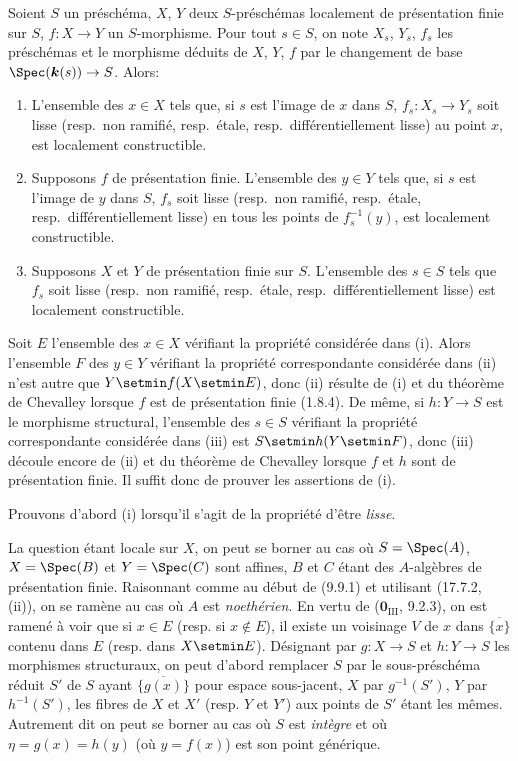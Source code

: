 \begin{proposition}[17.7.11]
\label{IV.17.7.11}
Soient $S$ un préschéma, $X$, $Y$ deux $S$-préschémas localement de présentation finie sur $S$, $f:X\to Y$ un $S$-morphisme. Pour tout $s\in S$, on note $X_s$, $Y_s$, $f_s$ les préschémas et le morphisme déduits de $X$, $Y$, $f$ par le changement de base $\Spec(\boldsymbol{k}(s))\to S$. Alors:
\begin{enumerate}
  \item[\textup{(i)}] L'ensemble des $x\in X$ tels que, si $s$ est l'image de $x$ dans $S$, $f_s:X_s\to Y_s$ soit lisse \textup{(resp.}\ non ramifié, \textup{resp.}\ étale, \textup{resp.}\ différentiellement lisse\textup{)} au point $x$, est localement constructible.
  \item[\textup{(ii)}] Supposons $f$ de présentation finie. L'ensemble des $y\in Y$ tels que, si $s$ est l'image de $y$ dans $S$, $f_s$ soit lisse \textup{(resp.}\ non ramifié, \textup{resp.}\ étale, \textup{resp.}\ différentiellement lisse\textup{)} en tous les points de $f_s^{-1}(y)$, est localement constructible.
  \item[\textup{(iii)}] Supposons $X$ et $Y$ de présentation finie sur $S$. L'ensemble des $s\in S$ tels que $f_s$ soit lisse \textup{(resp.}\ non ramifié, \textup{resp.}\ étale, \textup{resp.}\ différentiellement lisse\textup{)} est localement constructible.
\end{enumerate}
\end{proposition}

Soit $E$ l'ensemble des $x\in X$ vérifiant la propriété considérée dans (i). Alors l'ensemble $F$ des $y\in Y$ vérifiant la propriété correspondante considérée dans (ii) n'est
autre que $Y\setmin f(X\setmin E)$, donc (ii) résulte de (i) et du théorème de Chevalley lorsque $f$ est de présentation finie (1.8.4). De même, si $h:Y\to S$ est le morphisme structural, l'ensemble des $s\in S$ vérifiant la propriété correspondante considérée dans (iii) est $S\setmin h(Y\setmin F)$, donc (iii) découle encore de (ii) et du théorème de Chevalley lorsque $f$ et $h$ sont de présentation finie. Il suffit donc de prouver les assertions de (i).

Prouvons d'abord (i) lorsqu'il s'agit de la propriété d'être \emph{lisse}.

La question étant locale sur $X$, on peut se borner au cas où $S=\Spec(A)$, $X=\Spec(B)$ et $Y=\Spec(C)$ sont affines, $B$ et $C$ étant des $A$-algèbres de présentation finie. Raisonnant comme au début de (9.9.1) et utilisant (17.7.2, (ii)), on se ramène au cas où $A$ est \emph{noethérien}. En vertu de ($\mathbf{0}_{\mathrm{III}}$, 9.2.3), on est ramené à voir que si $x\in E$ (resp. si $x\notin E$), il existe un voisinage $V$ de $x$ dans $\overline{\{x\}}$ contenu dans $E$ (resp. dans $X\setmin E$). Désignant par $g:X\to S$ et $h:Y\to S$ les morphismes structuraux, on peut d'abord remplacer $S$ par le sous-préschéma réduit $S'$ de $S$ ayant $\overline{\{g(x)\}}$ pour espace sous-jacent, $X$ par $g^{-1}(S')$, $Y$ par $h^{-1}(S')$, les fibres de $X$ et $X'$ (resp. $Y$ et $Y'$) aux points de $S'$ étant les mêmes. Autrement dit on peut se borner au cas où $S$ est \emph{intègre} et où $\eta=g(x)=h(y)$ (où $y=f(x)$) est son point générique.


